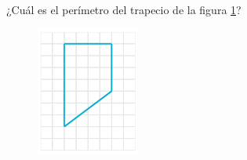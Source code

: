
\question[25]  ¿Cuál es el perímetro del trapecio de la figura \ref{fig:peri_trap_02}?
\begin{figure}[H]
    \begin{center}
        \includegraphics[width=0.3\textwidth]{../images/peri_trap_02.png}
    \end{center}
    \caption{}
    \label{fig:peri_trap_02}
\end{figure}